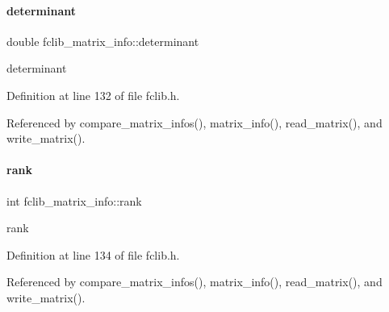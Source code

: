 \paragraph{\texorpdfstring{determinant}{determinant}}
{\footnotesize\ttfamily double fclib\+\_\+matrix\+\_\+info\+::determinant}



determinant 



Definition at line 132 of file fclib.\+h.



Referenced by compare\+\_\+matrix\+\_\+infos(), matrix\+\_\+info(), read\+\_\+matrix(), and write\+\_\+matrix().

\mbox{\label{structfclib__matrix__info_af838043a1769956958c4a66e6227227d}} 
\paragraph{\texorpdfstring{rank}{rank}}
{\footnotesize\ttfamily int fclib\+\_\+matrix\+\_\+info\+::rank}



rank 



Definition at line 134 of file fclib.\+h.



Referenced by compare\+\_\+matrix\+\_\+infos(), matrix\+\_\+info(), read\+\_\+matrix(), and write\+\_\+matrix().

